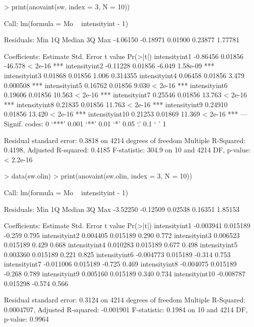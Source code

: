 \documentclass[a4paper,11pt]{article}
\begin{document}
\begin{Schunk}
\begin{Sinput}
> print(anovaint(sw, index = 3, N = 10))
\end{Sinput}
\begin{Soutput}
Call:
lm(formula = Mo ~ intensityint - 1)

Residuals:
     Min       1Q   Median       3Q      Max 
-4.06150 -0.18971  0.01900  0.23877  1.77781 

Coefficients:
               Estimate Std. Error t value Pr(>|t|)    
intensityint1  -0.86456    0.01856 -46.578  < 2e-16 ***
intensityint2  -0.11228    0.01856  -6.049 1.58e-09 ***
intensityint3   0.01868    0.01856   1.006 0.314355    
intensityint4   0.06458    0.01856   3.479 0.000508 ***
intensityint5   0.16762    0.01856   9.030  < 2e-16 ***
intensityint6   0.19606    0.01856  10.563  < 2e-16 ***
intensityint7   0.25546    0.01856  13.763  < 2e-16 ***
intensityint8   0.21835    0.01856  11.763  < 2e-16 ***
intensityint9   0.24910    0.01856  13.420  < 2e-16 ***
intensityint10  0.21253    0.01869  11.369  < 2e-16 ***
---
Signif. codes:  0 `***' 0.001 `**' 0.01 `*' 0.05 `.' 0.1 ` ' 1 

Residual standard error: 0.3818 on 4214 degrees of freedom
Multiple R-Squared: 0.4198,	Adjusted R-squared: 0.4185 
F-statistic: 304.9 on 10 and 4214 DF,  p-value: < 2.2e-16 
\end{Soutput}
\end{Schunk}

\begin{Schunk}
\begin{Sinput}
> data(sw.olin)
> print(anovaint(sw.olin, index = 3, N = 10))
\end{Sinput}
\begin{Soutput}
Call:
lm(formula = Mo ~ intensityint - 1)

Residuals:
     Min       1Q   Median       3Q      Max 
-3.52250 -0.12509  0.02538  0.16351  1.85153 

Coefficients:
                Estimate Std. Error t value Pr(>|t|)
intensityint1  -0.003941   0.015189  -0.259    0.795
intensityint2   0.004405   0.015189   0.290    0.772
intensityint3   0.006523   0.015189   0.429    0.668
intensityint4   0.010283   0.015189   0.677    0.498
intensityint5   0.003360   0.015189   0.221    0.825
intensityint6  -0.004773   0.015189  -0.314    0.753
intensityint7  -0.011006   0.015189  -0.725    0.469
intensityint8  -0.004075   0.015189  -0.268    0.789
intensityint9   0.005160   0.015189   0.340    0.734
intensityint10 -0.008787   0.015298  -0.574    0.566

Residual standard error: 0.3124 on 4214 degrees of freedom
Multiple R-Squared: 0.0004707,	Adjusted R-squared: -0.001901 
F-statistic: 0.1984 on 10 and 4214 DF,  p-value: 0.9964 
\end{Soutput}
\end{Schunk}
\end{document}
